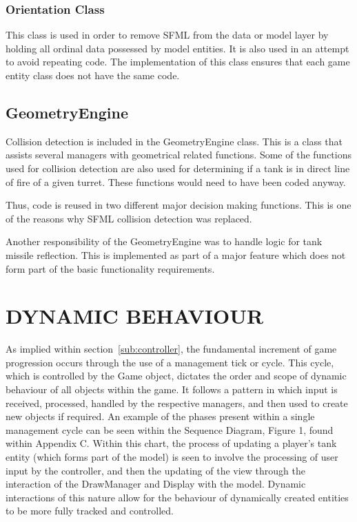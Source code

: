 \documentclass[10pt,twocolumn]{witseiepaper}
\begin{document}
\subsubsection{Orientation Class}
This class is used in order to remove SFML from the data or model layer by holding all ordinal data possessed by model entities. It is also used in an attempt to avoid repeating code. The implementation of this class ensures that each game entity class does not have the same code.

\subsection{GeometryEngine}
\label{sub:geometry}
Collision detection is included in the GeometryEngine class. This is a class that assists several managers with geometrical related functions. Some of the functions used for collision detection are also used for determining if a tank is in direct line of fire of a given turret. These functions would need to have been coded anyway. 

Thus, code is reused in two different major decision making functions. This is one of the reasons why SFML collision detection was replaced. 

Another responsibility of the GeometryEngine was to handle logic for tank missile reflection. This is implemented as part of a major feature which does not form part of the basic functionality requirements.





\section{DYNAMIC BEHAVIOUR} 

As implied within section~\ref{sub:controller}, the fundamental increment of game progression occurs through the use of a management tick or cycle. This cycle, which is controlled by the Game object, dictates the order and scope of dynamic behaviour of all objects within the game. It follows a pattern in which input is received, processed, handled by the respective managers, and then used to create new objects if required. An example of the phases present within a single management cycle can be seen within the Sequence Diagram, Figure 1, found within Appendix C. Within this chart, the process of updating a player's tank entity (which forms part of the model) is seen to involve the processing of user input by the controller, and then the updating of the view through the interaction of the DrawManager and Display with the model. Dynamic interactions of this nature allow for the behaviour of dynamically created entities to be more fully tracked and controlled.  
\end{document}
